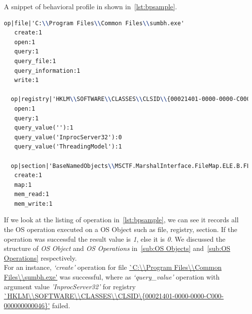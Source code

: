 A snippet of behavioral profile in shown in~\autoref{lst:bpsample}.
\begin{lstlisting}[basicstyle=\tiny,language=TeX,caption={Behvaioral Profile sample}, label={lst:bpsample}]
  op|file|'C:\\Program Files\\Common Files\\sumbh.exe'
   create:1
   open:1
   query:1
   query_file:1
   query_information:1
   write:1

  op|registry|'HKLM\\SOFTWARE\\CLASSES\\CLSID\\{00021401-0000-0000-C000-000000000046}'
   open:1
   query:1
   query_value(''):1
   query_value('InprocServer32'):0
   query_value('ThreadingModel'):1

  op|section|'BaseNamedObjects\\MSCTF.MarshalInterface.FileMap.ELE.B.FLKMG'
   create:1
   map:1
   mem_read:1
   mem_write:1
\end{lstlisting}
If we look at the listing of operation in~\autoref{lst:bpsample}, we can see it records all the OS operation executed on a OS Object such as file, registry, section.
If the operation was successful the result value is \emph{1}, else it is \emph{0}.
We discussed the structure of \emph{OS Object} and \emph{OS Operations} in~\autoref{sub:OS Objects} and~\autoref{sub:OS Operations}  respectively.\\
For an instance, \textit{`create'} operation for file \url{`C:\\Program Files\\Common Files\\sumbh.exe'} was successful, where as \textit{`query\_value'} operation with argument value \emph{'InprocServer32'} for registry \url{`HKLM\\SOFTWARE\\CLASSES\\CLSID\\{00021401-0000-0000-C000-000000000046}'} failed. %
